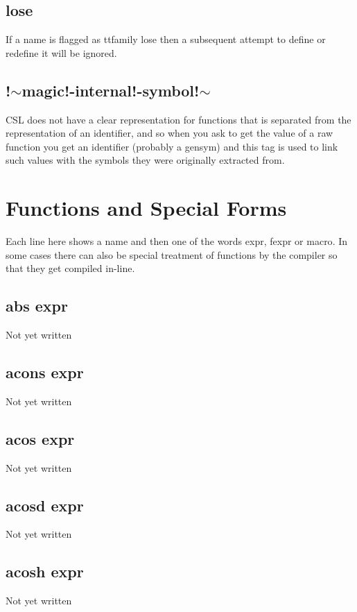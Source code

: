 \documentclass[a4paper,11pt]{article}
\begin{document}
\subsection{\ttfamily lose}
If a name is flagged as {ttfamily lose} then a subsequent attempt to
define or redefine it will be ignored.
\subsection{\ttfamily !$\sim$magic!-internal!-symbol!$\sim$}
CSL does not have a clear representation for functions that is separated from
the representation of an identifier, and so when you ask to get the value
of a raw function you get an identifier (probably a gensym) and this
tag is used to link such values with the symbols they were originally
extracted from.

\section{Functions and Special Forms}

Each line here shows a name and then one of the words {\ttfamily expr},
{\ttfamily fexpr} or {\ttfamily macro}. In some cases there can also be special
treatment of functions by the compiler so that they get compiled in-line.

\subsection{\ttfamily abs expr}
Not yet written

\subsection{\ttfamily acons expr}
Not yet written

\subsection{\ttfamily acos expr}
Not yet written

\subsection{\ttfamily acosd expr}
Not yet written

\subsection{\ttfamily acosh expr}
Not yet written
\end{document}
